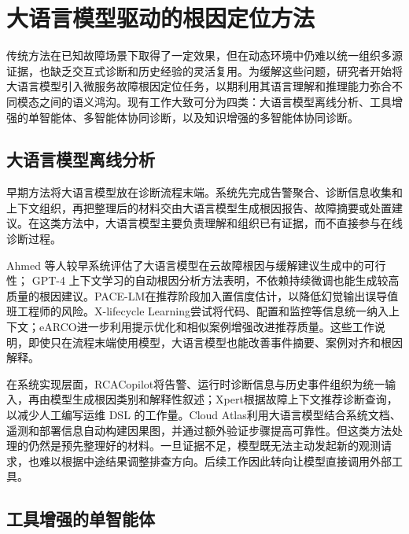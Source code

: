 
\section{大语言模型驱动的根因定位方法}

传统方法在已知故障场景下取得了一定效果，但在动态环境中仍难以统一组织多源证据，也缺乏交互式诊断和历史经验的灵活复用。为缓解这些问题，研究者开始将大语言模型引入微服务故障根因定位任务，以期利用其语言理解和推理能力弥合不同模态之间的语义鸿沟。现有工作大致可分为四类：大语言模型离线分析、工具增强的单智能体、多智能体协同诊断，以及知识增强的多智能体协同诊断。

\subsection{大语言模型离线分析}

早期方法将大语言模型放在诊断流程末端。系统先完成告警聚合、诊断信息收集和上下文组织，再把整理后的材料交由大语言模型生成根因报告、故障摘要或处置建议。在这类方法中，大语言模型主要负责理解和组织已有证据，而不直接参与在线诊断过程。

Ahmed 等人\cite{ahmed2023recommending}较早系统评估了大语言模型在云故障根因与缓解建议生成中的可行性； GPT-4 上下文学习的自动根因分析方法\cite{zhang2024gpt4iclrca}表明，不依赖持续微调也能生成较高质量的根因建议。PACE-LM\cite{zhang2023pacelm}在推荐阶段加入置信度估计，以降低幻觉输出误导值班工程师的风险。X-lifecycle Learning\cite{goel2024xlifecycle}尝试将代码、配置和监控等信息统一纳入上下文；eARCO\cite{goel2025earco}进一步利用提示优化和相似案例增强改进推荐质量。这些工作说明，即使只在流程末端使用模型，大语言模型也能改善事件摘要、案例对齐和根因解释。

在系统实现层面，RCACopilot\cite{chen2024rcacopilot}将告警、运行时诊断信息与历史事件组织为统一输入，再由模型生成根因类别和解释性叙述；Xpert\cite{xpert-jiang2024}根据故障上下文推荐诊断查询，以减少人工编写运维 DSL 的工作量。Cloud Atlas\cite{xie2024cloud}利用大语言模型结合系统文档、遥测和部署信息自动构建因果图，并通过额外验证步骤提高可靠性。但这类方法处理的仍然是预先整理好的材料。一旦证据不足，模型既无法主动发起新的观测请求，也难以根据中途结果调整排查方向。后续工作因此转向让模型直接调用外部工具。

\subsection{工具增强的单智能体}

